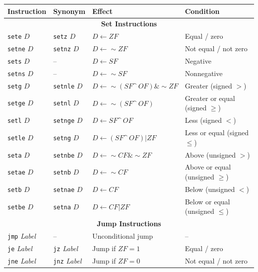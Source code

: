 \documentclass{article}
\begin{document}
\clearpage
\begin{table}[h]
    \centering
    \small
    \renewcommand{\arraystretch}{1.2}
    \begin{tabular}{l l l l}
        \toprule
        \textbf{Instruction} & \textbf{Synonym} & \textbf{Effect} & \textbf{Condition} \\
        \midrule
        \multicolumn{4}{c}{\textbf{Set Instructions}} \\
        \midrule
        \texttt{sete} $D$  & \texttt{setz} $D$  & $D \leftarrow ZF$ & Equal / zero \\
        \texttt{setne} $D$  & \texttt{setnz} $D$  & $D \leftarrow \sim ZF$ & Not equal / not zero \\
        \texttt{sets} $D$  & – & $D \leftarrow SF$ & Negative \\
        \texttt{setns} $D$  & – & $D \leftarrow \sim SF$ & Nonnegative \\
        \texttt{setg} $D$  & \texttt{setnle} $D$  & $D \leftarrow \sim (SF \^\ OF) \& \sim ZF$ & Greater (signed $>$) \\
        \texttt{setge} $D$  & \texttt{setnl} $D$  & $D \leftarrow \sim (SF \^\ OF)$ & Greater or equal (signed $\geq$) \\
        \texttt{setl} $D$  & \texttt{setnge} $D$  & $D \leftarrow SF \^\ OF$ & Less (signed $<$) \\
        \texttt{setle} $D$  & \texttt{setng} $D$  & $D \leftarrow (SF \^\ OF) | ZF$ & Less or equal (signed $\leq$) \\
        \texttt{seta} $D$  & \texttt{setnbe} $D$  & $D \leftarrow \sim CF \& \sim ZF$ & Above (unsigned $>$) \\
        \texttt{setae} $D$  & \texttt{setnb} $D$  & $D \leftarrow \sim CF$ & Above or equal (unsigned $\geq$) \\
        \texttt{setb} $D$  & \texttt{setnae} $D$  & $D \leftarrow CF$ & Below (unsigned $<$) \\
        \texttt{setbe} $D$  & \texttt{setna} $D$  & $D \leftarrow CF | ZF$ & Below or equal (unsigned $\leq$) \\
        \midrule
        \multicolumn{4}{c}{\textbf{Jump Instructions}} \\
        \midrule
                \texttt{jmp} \textit{Label}  & – & Unconditional jump & – \\
        \texttt{je} \textit{Label}  & \texttt{jz} \textit{Label} & Jump if $ZF = 1$ & Equal / zero \\
        \texttt{jne} \textit{Label}  & \texttt{jnz} \textit{Label} & Jump if $ZF = 0$ & Not equal / not zero \\

\end{tabular}
\end{table}
\end{document}

